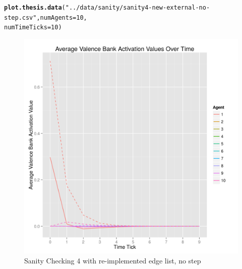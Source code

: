 \documentclass{article}\usepackage[]{graphicx}\usepackage[]{color}
\makeatletter
\def\maxwidth{ %
  \ifdim\Gin@nat@width>\linewidth
    \linewidth
  \else
    \Gin@nat@width
  \fi
}
\newcommand{\hlnum}[1]{\textcolor[rgb]{0.686,0.059,0.569}{#1}}%
\newcommand{\hlstr}[1]{\textcolor[rgb]{0.192,0.494,0.8}{#1}}%
\newcommand{\hlstd}[1]{\textcolor[rgb]{0.345,0.345,0.345}{#1}}%
\newcommand{\hlkwc}[1]{\textcolor[rgb]{0.333,0.667,0.333}{#1}}%
\newcommand{\hlkwd}[1]{\textcolor[rgb]{0.737,0.353,0.396}{\textbf{#1}}}%
\newenvironment{kframe}{%
 \def\at@end@of@kframe{}%
 \ifinner\ifhmode%
  \def\at@end@of@kframe{\end{minipage}}%
  \begin{minipage}{\columnwidth}%
 \fi\fi%
 \def\FrameCommand##1{\hskip\@totalleftmargin \hskip-\fboxsep
 \colorbox{shadecolor}{##1}\hskip-\fboxsep
     \hskip-\linewidth \hskip-\@totalleftmargin \hskip\columnwidth}%
 \MakeFramed {\advance\hsize-\width
   \@totalleftmargin\z@ \linewidth\hsize
   \@setminipage}}%
 {\par\unskip\endMakeFramed%
 \at@end@of@kframe}
\newenvironment{knitrout}{}{} %
\makeatother
\begin{document}
\newpage
\begin{knitrout}
\color{fgcolor}\begin{kframe}
\begin{alltt}
\hlkwd{plot.thesis.data}\hlstd{(}\hlstr{"../data/sanity/sanity4-new-external-no-step.csv"}\hlstd{,} \hlkwc{numAgents} \hlstd{=} \hlnum{10}\hlstd{,}
    \hlkwc{numTimeTicks} \hlstd{=} \hlnum{10}\hlstd{)}
\end{alltt}
\end{kframe}\begin{figure}[]

\includegraphics[width=\maxwidth]{figure/plot-sanity-4-v2-nostep} \caption[Sanity Checking 4 with re-implemented edge list, no step]{Sanity Checking 4 with re-implemented edge list, no step\label{fig:plot-sanity-4-v2-nostep}}
\end{figure}


\end{knitrout}


\newpage
\end{document}

